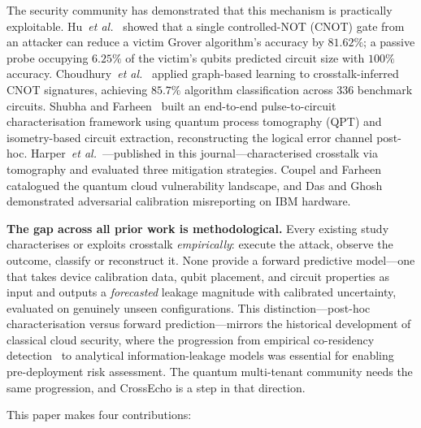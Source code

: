 \documentclass[ASNA,twocolumn]{USG}
\begin{document}
The security community has demonstrated that this mechanism is practically exploitable. Hu~\emph{et al.}~\cite{hu2025swap} showed that a single controlled-NOT (CNOT) gate from an attacker can reduce a victim Grover algorithm's accuracy by $81.62\%$; a passive probe occupying $6.25\%$ of the victim's qubits predicted circuit size with $100\%$ accuracy. Choudhury~\emph{et al.}~\cite{choudhury2024crosstalk} applied graph-based learning to crosstalk-inferred CNOT signatures, achieving $85.7\%$ algorithm classification across $336$ benchmark circuits. Shubha and Farheen~\cite{shubha2025pulse} built an end-to-end pulse-to-circuit characterisation framework using quantum process tomography (QPT) and isometry-based circuit extraction, reconstructing the logical error channel post-hoc. Harper~\emph{et al.}~\cite{harper2025crosstalk}---published in this journal---characterised crosstalk via tomography and evaluated three mitigation strategies. Coupel and Farheen~\cite{coupel2025survey} catalogued the quantum cloud vulnerability landscape, and Das and Ghosh~\cite{das2025calibration} demonstrated adversarial calibration misreporting on IBM hardware.

\textbf{The gap across all prior work is methodological.} Every existing study characterises or exploits crosstalk \emph{empirically}: execute the attack, observe the outcome, classify or reconstruct it. None provide a forward predictive model---one that takes device calibration data, qubit placement, and circuit properties as input and outputs a \emph{forecasted} leakage magnitude with calibrated uncertainty, evaluated on genuinely unseen configurations. This distinction---post-hoc characterisation versus forward prediction---mirrors the historical development of classical cloud security, where the progression from empirical co-residency detection~\cite{ristenpart2009hey} to analytical information-leakage models was essential for enabling pre-deployment risk assessment. The quantum multi-tenant community needs the same progression, and CrossEcho is a step in that direction.

This paper makes four contributions:
\end{document}
